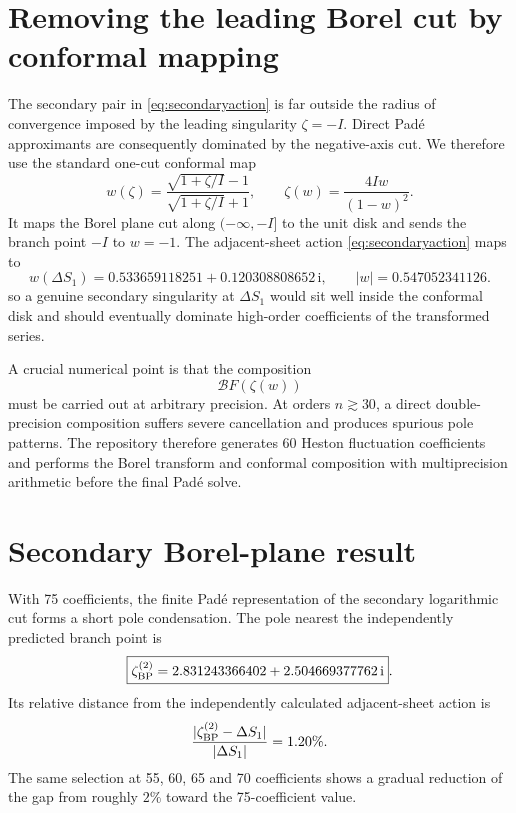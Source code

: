 \documentclass[11pt]{article}
\newcommand{\ii}{\mathrm i}
\newcommand{\calB}{\mathcal B}
\begin{document}
\section{Removing the leading Borel cut by conformal mapping}
The secondary pair in \eqref{eq:secondaryaction} is far outside the radius of convergence imposed by the leading singularity $\zeta=-I$. Direct Pad\'e approximants are consequently dominated by the negative-axis cut. We therefore use the standard one-cut conformal map
\begin{equation}
 w(\zeta)=
 \frac{\sqrt{1+\zeta/I}-1}{\sqrt{1+\zeta/I}+1},
 \qquad
 \zeta(w)=\frac{4Iw}{(1-w)^2}.
 \label{eq:conformal}
\end{equation}
It maps the Borel plane cut along $(-\infty,-I]$ to the unit disk and sends the branch point $-I$ to $w=-1$. The adjacent-sheet action \eqref{eq:secondaryaction} maps to
\begin{equation}
 w(\Delta S_1)
 =0.533659118251+0.120308808652\,\ii,
 \qquad
 |w|=0.547052341126.
 \label{eq:targetw}
\end{equation}
so a genuine secondary singularity at $\Delta S_1$ would sit well inside the conformal disk and should eventually dominate high-order coefficients of the transformed series.

A crucial numerical point is that the composition
\begin{equation}
 \calB F(\zeta(w))
\end{equation}
must be carried out at arbitrary precision. At orders $n\gtrsim30$, a direct double-precision composition suffers severe cancellation and produces spurious pole patterns. The repository therefore generates 60 Heston fluctuation coefficients and performs the Borel transform and conformal composition with multiprecision arithmetic before the final Pad\'e solve.

\section{Secondary Borel-plane result}
With 75 coefficients, the finite Pad\'e representation of the secondary logarithmic cut forms a short pole condensation. The pole nearest the independently predicted branch point is
\begin{equation}
 \boxed{
 \zeta_{\rm BP}^{(2)}
 =2.831243366402+2.504669377762\,\ii}.
 \label{eq:secondarypade}
\end{equation}
Its relative distance from the independently calculated adjacent-sheet action is
\begin{equation}
 \frac{|\zeta_{\rm BP}^{(2)}-\Delta S_1|}{|\Delta S_1|}
 =1.20\%.
 \label{eq:secondaryerror}
\end{equation}
The same selection at 55, 60, 65 and 70 coefficients shows a gradual reduction of the gap from roughly $2\%$ toward the 75-coefficient value.
\end{document}
